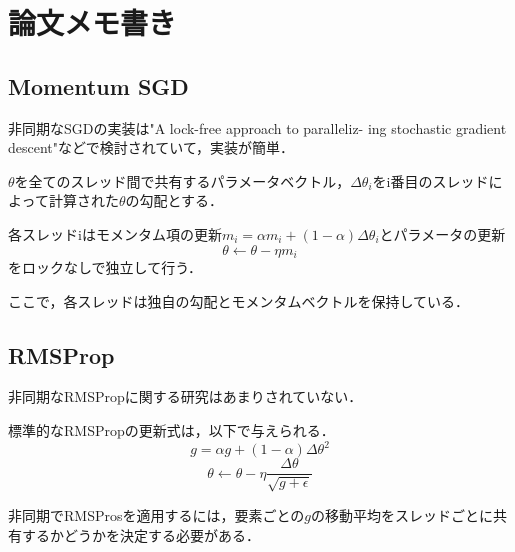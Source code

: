 \documentclass{jarticle}
\begin{document}
\section{論文メモ書き}

\subsection{Momentum SGD}
非同期なSGDの実装は"A lock-free approach to paralleliz- ing stochastic gradient descent"などで検討されていて，実装が簡単．

$\theta$を全てのスレッド間で共有するパラメータベクトル，$\Delta \theta_i$をi番目のスレッドによって計算された$\theta$の勾配とする．

各スレッドiはモメンタム項の更新$m_i=\alpha m_i+(1-\alpha)\Delta\theta_i$とパラメータの更新
$$\theta\gets\theta-\eta m_i$$
をロックなしで独立して行う．

ここで，各スレッドは独自の勾配とモメンタムベクトルを保持している．

\subsection{RMSProp}
非同期なRMSPropに関する研究はあまりされていない．

標準的なRMSPropの更新式は，以下で与えられる．
$$g=\alpha g + (1-\alpha)\Delta\theta^2$$
$$\theta \gets \theta - \eta \frac{\Delta\theta}{\sqrt{g+\epsilon}}$$

非同期でRMSProsを適用するには，要素ごとの$g$の移動平均をスレッドごとに共有するかどうかを決定する必要がある．
\end{document}

